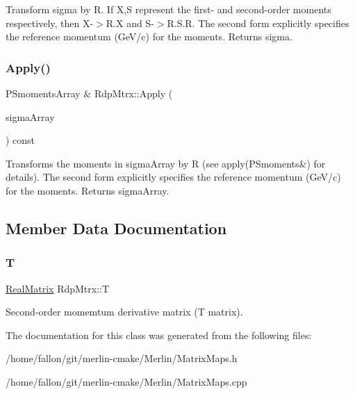 Transform sigma by R. If X,S represent the first-\/ and second-\/order moments respectively, then X-\/$>$R.\+X and S-\/$>$R.\+S.\+R\textquotesingle{}. The second form explicitly specifies the reference momentum (Ge\+V/c) for the moments. Returns sigma. \mbox{\label{classRdpMtrx_acaaf913bf301667d1b6b91d0ddc0f026}} 
\subsubsection{\texorpdfstring{Apply()}{Apply()}\hspace{0.1cm}{\footnotesize\ttfamily [4/4]}}
{\footnotesize\ttfamily P\+Smoments\+Array \& Rdp\+Mtrx\+::\+Apply (\begin{DoxyParamCaption}\item[{P\+Smoments\+Array \&}]{sigma\+Array }\end{DoxyParamCaption}) const}

Transforms the moments in sigma\+Array by R (see apply(\+P\+Smoments\&) for details). The second form explicitly specifies the reference momentum (Ge\+V/c) for the moments. Returns sigma\+Array. 

\subsection{Member Data Documentation}
\mbox{\label{classRdpMtrx_a51af679232ea4866662715e629362efe}} 
\subsubsection{\texorpdfstring{T}{T}}
{\footnotesize\ttfamily \hyperlink{classTLAS_1_1Matrix}{Real\+Matrix} Rdp\+Mtrx\+::T}

Second-\/order momemtum derivative matrix (T matrix). 

The documentation for this class was generated from the following files\+:\begin{DoxyCompactItemize}
\item 
/home/fallon/git/merlin-\/cmake/\+Merlin/Matrix\+Maps.\+h\item 
/home/fallon/git/merlin-\/cmake/\+Merlin/Matrix\+Maps.\+cpp\end{DoxyCompactItemize}
